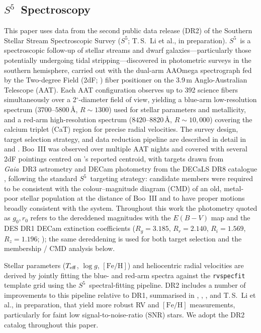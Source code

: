 \documentclass[twocolumn]{aastex631}
\newcommand{\SSSSS}{${S}^5$\xspace}
\newcommand{\gaia}{\textit{Gaia}\xspace}
\begin{document}
\subsection{\SSSSS\ Spectroscopy}
This paper uses data from the second public data release (DR2) of the Southern Stellar Stream Spectroscopic Survey (\SSSSS; T.\,S.~Li et al., in preparation).
\SSSSS\ is a spectroscopic follow-up of stellar streams and dwarf galaxies---particularly those potentially undergoing tidal stripping---discovered in photometric surveys in the southern hemisphere, carried out with the dual-arm AAOmega spectrograph \citep{Sharp2006} fed by the Two-degree Field (2dF; \citealt{Lewis2002}) fiber positioner on the 3.9\,m Anglo-Australian Telescope (AAT).
Each AAT configuration observes up to 392 science fibers simultaneously over a 2\ensuremath{^{\circ}}-diameter field of view, yielding a blue-arm low-resolution spectrum ($3700$--$5800$\,\AA, $R \sim 1300$) used for stellar parameters and metallicity, and a red-arm high-resolution spectrum ($8420$--$8820$\,\AA, $R \sim 10{,}000$) covering the calcium triplet (CaT) region for precise radial velocities.
The survey design, target selection strategy, and data reduction pipeline are described in detail in \citet{Li2019} and \citet{Li2022}.
Boo~III was observed over multiple AAT nights and covered with several 2dF pointings centred on \citet{Grillmair2009}'s reported centroid, with targets drawn from \gaia\ DR3 \citep{GaiaMission, GaiaDR3} astrometry and DECam photometry from the DECaLS DR8 catalogue \citep{DECaLS}, following the standard \SSSSS\ targeting strategy: candidate members were required to be consistent with the colour--magnitude diagram (CMD) of an old, metal-poor stellar population at the distance of Boo~III and to have proper motions broadly consistent with the system. Throughout this work the photometry quoted as $g_0, r_0$ refers to the dereddened magnitudes with the \citet{Schlegel1998} $E(B-V)$ map and the DES DR1 DECam extinction coefficients ($R_g = 3.185$, $R_r = 2.140$, $R_i = 1.569$, $R_z = 1.196$; \citealt{Abbott2018_DESDR1}); the same dereddening is used for both target selection and the membership / CMD analysis below.

Stellar parameters ($T_{\rm eff}$, $\log g$, $[\mathrm{Fe/H}]$) and heliocentric radial velocities are derived by jointly fitting the blue- and red-arm spectra against the \texttt{rvspecfit} template grid \citep{Koposov2019_rvspecfit} using the \SSSSS\ spectral-fitting pipeline. DR2 includes a number of improvements to this pipeline relative to DR1, summarised in \citet{Ji2021}, \citet{Sandford2025}, \citet{Limberg2025}, and T.\,S.~Li et al., in preparation, that yield more robust RV and $[\mathrm{Fe/H}]$ measurements, particularly for faint low signal-to-noise-ratio (SNR) stars.
We adopt the DR2 catalog throughout this paper.
\end{document}
